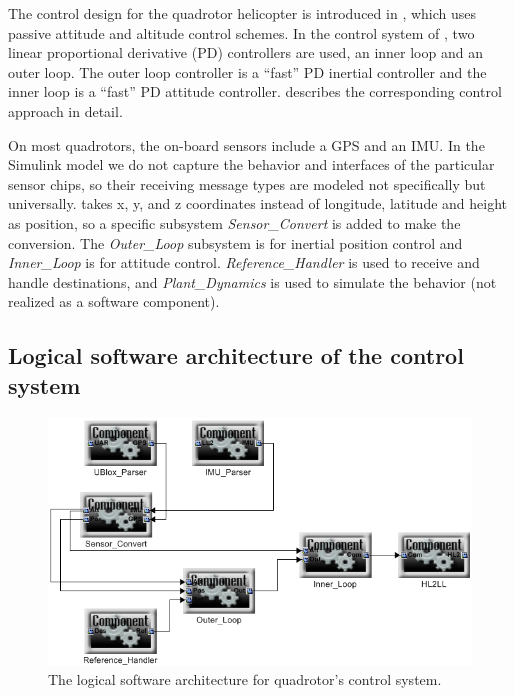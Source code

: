\documentclass[10pt, conference, compsocconf]{IEEEtran}
\begin{document}
The control design for the quadrotor helicopter is introduced in \cite{quad:passcontrol}, which uses passive attitude and altitude control schemes. In the control system of \cite{quad:passcontrol}, two linear proportional derivative (PD) controllers are used, an inner loop and an outer loop. The outer loop controller is a ``fast'' PD inertial controller and the inner loop is a ``fast'' PD attitude controller. \cite{quad:passcontrol} describes the corresponding control approach in detail.

On most quadrotors, the on-board sensors include a GPS and an IMU. In the Simulink model we do not capture the behavior and interfaces of the particular sensor chips, so their receiving message types are modeled not specifically but universally. \cite{quad:passcontrol} takes x, y, and z coordinates instead of longitude, latitude and height as position, so a specific subsystem \emph{Sensor\_Convert} is added to make the conversion. The \emph{Outer\_Loop} subsystem is for inertial position control and \emph{Inner\_Loop} is for attitude control. \emph{Reference\_Handler} is used to receive and handle destinations, and \emph{Plant\_Dynamics} is used to simulate the behavior (not realized as a software component).

\subsection{Logical software architecture of the control system}

\begin{figure}[!t]
\centering
\includegraphics[width=\columnwidth]{figures/QuadrotorLogicalSoftwareArchitecture.png}
\caption{The logical software architecture for quadrotor's control system.}
\label{fig:QuadrotorLogicalSoftwareArchitecture}
\end{figure}
\end{document}
